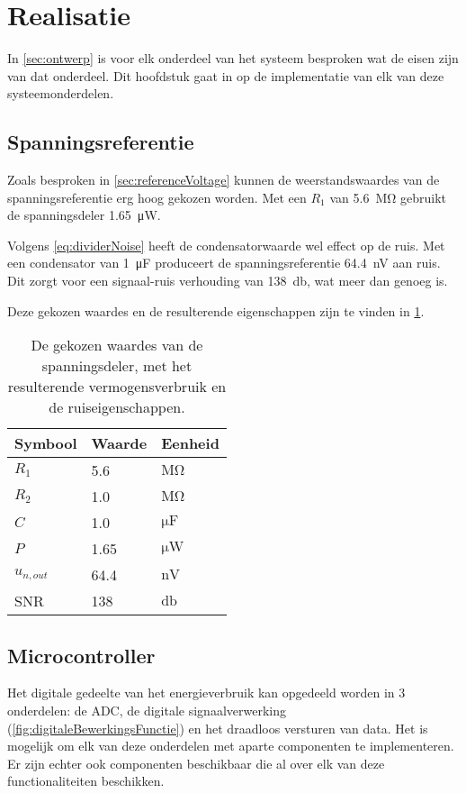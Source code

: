 \section{Realisatie}
In \cref{sec:ontwerp} is voor elk onderdeel van het systeem besproken wat de eisen zijn van dat onderdeel. Dit hoofdstuk gaat in op de implementatie van elk van deze systeemonderdelen.

\subsection{Spanningsreferentie}
Zoals besproken in \cref{sec:referenceVoltage} kunnen de weerstandswaardes van de spanningsreferentie erg hoog gekozen worden. Met een $R_1$ van \qty{5.6}{\mega\ohm} gebruikt de spanningsdeler \qty{1.65}{\micro\watt}.

Volgens \cref{eq:dividerNoise} heeft de condensatorwaarde wel effect op de ruis. Met een condensator van \qty{1}{\micro\farad} produceert de spanningsreferentie \qty{64.4}{\nano\volt} aan ruis. Dit zorgt voor een signaal-ruis verhouding van \qty{138}{\decibel}, wat meer dan genoeg is.

Deze gekozen waardes en de resulterende eigenschappen zijn te vinden in \cref{tab:divider}.

\begin{table}[!htbp]
\centering
\begin{tabular}{l|l|l}
    Symbool & Waarde & Eenheid \\
    \hline
    $R_1$       & 5.6  & $\si{\mega\ohm}$   \\
    $R_2$       & 1.0  & $\si{\mega\ohm}$   \\
    $C$         & 1.0  & $\si{\micro\farad}$\\
    $P$         & 1.65 & $\si{\micro\watt}$ \\
    $u_{n,out}$ & 64.4 & $\si{\nano\volt}$  \\
    SNR         & 138  & $\si{\decibel}$
\end{tabular}
\caption{De gekozen waardes van de spanningsdeler, met het resulterende vermogensverbruik en de ruiseigenschappen.}
\label{tab:divider}
\end{table}


\subsection{Microcontroller}
Het digitale gedeelte van het energieverbruik kan opgedeeld worden in 3 onderdelen: de ADC, de digitale signaalverwerking (\cref{fig:digitaleBewerkingsFunctie}) en het draadloos versturen van data. Het is mogelijk om elk van deze onderdelen met aparte componenten te implementeren. Er zijn echter ook componenten beschikbaar die al over elk van deze functionaliteiten beschikken.

